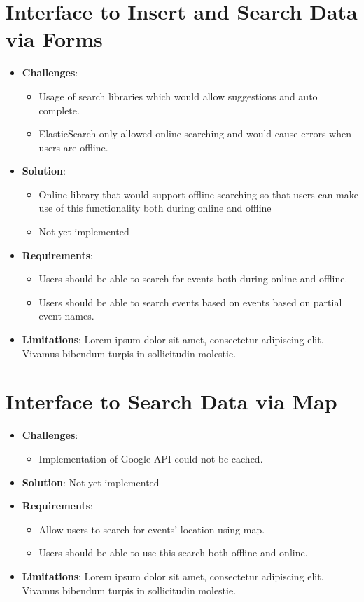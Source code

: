 \documentclass[11pt, a4paper]{article}
\begin{document}
\section{Interface to Insert and Search Data via Forms}
\begin{itemize}
  \item \textbf{Challenges}: 
  \begin{itemize}
    \item Usage of search libraries which would allow suggestions and auto complete. 
    \item ElasticSearch only allowed online searching and would cause errors when users are offline.
  \end{itemize}
  \item \textbf{Solution}: 
  \begin{itemize}
    \item Online library that would support offline searching so that users can make use of this 
    functionality both during online and offline
    \item Not yet implemented
  \end{itemize}
  \item \textbf{Requirements}: 
  \begin{itemize}
    \item Users should be able to search for events both during online and offline.
    \item Users should be able to search events based on events based on partial event names.
  \end{itemize}
  
  \item \textbf{Limitations}: Lorem ipsum dolor sit amet, consectetur adipiscing elit. Vivamus
  bibendum turpis in sollicitudin molestie.
\end{itemize}

\section{Interface to Search Data via Map}
\begin{itemize}
  \item \textbf{Challenges}:
  \begin{itemize}
    \item Implementation of Google API could not be cached. 
  \end{itemize}
  \item \textbf{Solution}: Not yet implemented
  \item \textbf{Requirements}: 
  \begin{itemize}
    \item Allow users to search for events' location using map.
    \item Users should be able to use this search both offline and online.
  \end{itemize}
  \item \textbf{Limitations}: Lorem ipsum dolor sit amet, consectetur adipiscing elit. Vivamus
  bibendum turpis in sollicitudin molestie.
\end{itemize}
\end{document}
